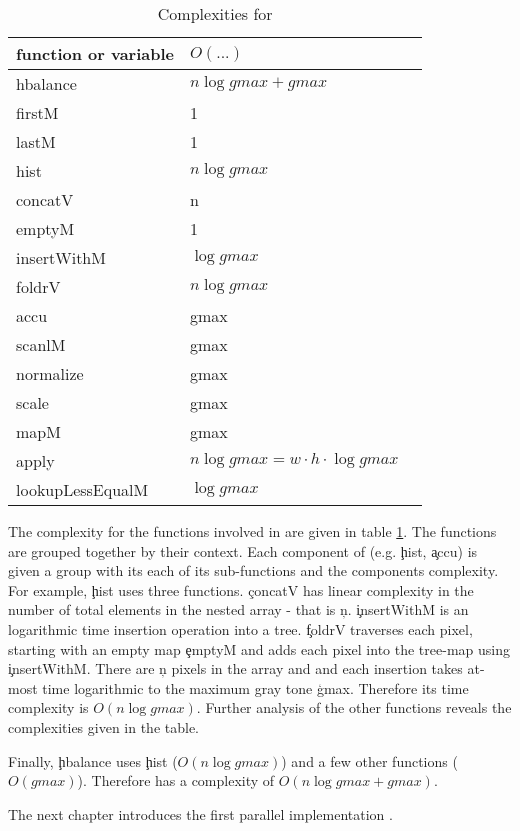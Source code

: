   \begin{table}[h!]
    \caption{Complexities for \seq}
    \label{table:seq}
    \centering
    \begin{tabular}{lll}
        \toprule
        function or variable & $O(...)$ \\
        \midrule
        hbalance          & $n \log gmax + gmax$ \\
        firstM           & 1\\ 
        lastM            & 1\\
        \midrule
        hist              & $n \log gmax$\\
        concatV          & n \\ 
        emptyM           & 1\\ 
        insertWithM      & $\log gmax$\\ 
        foldrV           & $n \log gmax$ \\ 
        \midrule
        accu              & gmax\\ 
        scanlM           & gmax\\
        \midrule
        normalize         & gmax\\ 
        scale             & gmax\\ 
        mapM             & gmax\\ 
        \midrule
        apply             & $n \log gmax = w \cdot h \cdot \log gmax$ \\
        lookupLessEqualM & $\log gmax$ \\ 
    \end{tabular}
  \end{table}
  
  The complexity for the functions involved in \seq are given
  in table \ref{table:seq}.
  The functions are grouped together by their context.
  Each component of \seq (e.g. \c{hist}, \c{accu}) is
  given a group with its each of its sub-functions and
  the components complexity.
  For example, \c{hist} uses three functions.
  \c{concatV} has linear complexity in the number
  of total elements in the nested array - that is \c{n}.
  \c{insertWithM} is an logarithmic time insertion operation
  into a tree. \c{foldrV} traverses each pixel,
  starting with an empty map \c{emptyM} and
  adds each pixel into the tree-map using \c{insertWithM}.
  There are \c{n} pixels in the array and and each insertion
  takes at-most time logarithmic to the maximum gray tone \c{gmax}.
  Therefore its time complexity is $O(n \log gmax)$.
  Further analysis of the other functions reveals the complexities
  given in the table.
  
  
  Finally, \c{hbalance} uses
  \c{hist} ($O(n \log gmax)$) and a few
  other functions ($O(gmax)$). 
  Therefore \seq has a complexity of $O(n \log gmax + gmax)$.
  
  \p
  The next chapter introduces the first parallel implementation \man.
  

